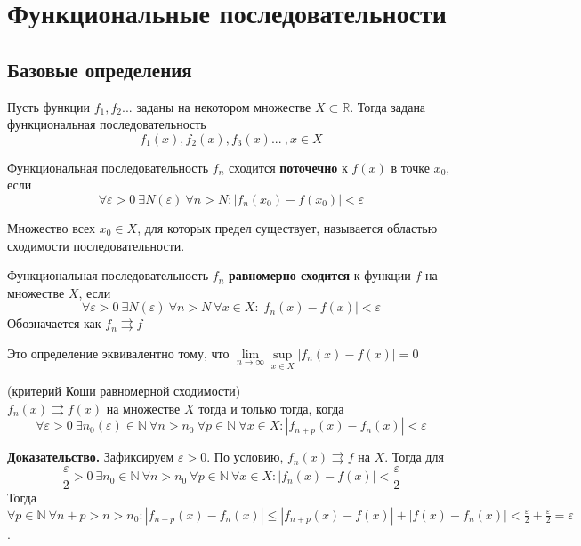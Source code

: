 \section{Функциональные последовательности}
\subsection{Базовые определения}
\begin{defin}
Пусть функции $f_1,f_2...$ заданы на некотором множестве 
$X\subset \mathbb{R}$. Тогда задана функциональная последовательность
$$f_1(x),f_2(x),f_3(x)...~,x\in X$$
\end{defin}
\begin{defin}
    Функциональная последовательность $f_n$ сходится \textbf{поточечно}
    к $f(x)$ в точке  $x_0$, если
$$\forall \varepsilon>0~\exists N(\varepsilon)~\forall n>N:
|f_n(x_0)-f(x_0)|<\varepsilon$$
\end{defin}
Множество всех $x_0\in X$, для которых
предел существует, называется областью сходимости последовательности. 
\begin{defin}
Функциональная последовательность $f_n$ \textbf{равномерно сходится} к 
функции $f$ на множестве $X$, если 
$$\forall \varepsilon>0~\exists N(\varepsilon)~\forall n>N~\forall x\in X:
|f_n(x)-f(x)|<\varepsilon$$
Обозначается как  $f_n\rightrightarrows f$
\end{defin}
Это определение эквивалентно тому, что
$\lim\limits_{n \to \infty} \sup\limits_{x\in X}|f_n(x)-f(x)|=0$
\begin{theor}
    (критерий Коши равномерной сходимости)\\
    $f_n(x)\rightrightarrows f(x)$ на множестве  $X$ тогда и только тогда,
    когда
$$\forall \varepsilon>0~\exists n_0(\varepsilon)\in\mathbb{N}~\forall n>n_0~
    \forall p\in\mathbb{N}~\forall x\in X: |f_{n+p}(x)-f_n(x)|<\varepsilon$$

\end{theor}
\textbf{Доказательство.} Зафиксируем $\varepsilon>0$. По условию,
$f_n(x)\rightrightarrows f$ на $X$. Тогда для  
$$\frac{\varepsilon}{2}>0~\exists n_0\in\mathbb{N}~\forall n>n_0~\forall p\in
\mathbb{N}~\forall x\in X:|f_{n}(x)-f(x)|<\frac{\varepsilon}{2}$$
Тогда $\forall p\in \mathbb{N}~\forall n+p>n>n_0:|f_{n+p}(x)-f_{n}(x)|
\leqslant |f_{n+p}(x)-f(x)|+|f(x)-f_{n}(x)|<\frac{\varepsilon}{2}
+\frac{\varepsilon}{2}=\varepsilon$.

